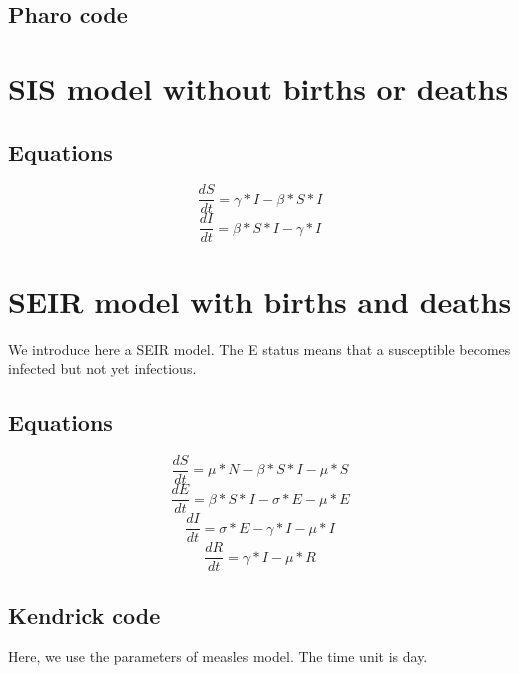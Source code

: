 \documentclass[a4paper,10pt,twoside]{book}
\begin{document}
\subsection{ Pharo code}\section{ SIS model without births or deaths}\subsection{Equations}

\begin{equation}
\frac{dS}{dt} = \gamma*I-\beta*S*I
\end{equation}
\begin{equation}
\frac{dI}{dt} = \beta*S*I-\gamma*I
\end{equation}
\section{ SEIR model with births and deaths}
We introduce here a SEIR model. The E status means that a susceptible becomes infected but not yet infectious.
\subsection{Equations}

  \begin{equation}
    \frac{dS}{dt} = \mu*N - \beta*S*I - \mu*S
  \end{equation}
  \begin{equation}
    \frac{dE}{dt} = \beta*S*I - \sigma*E - \mu*E
  \end{equation}
  \begin{equation}
    \frac{dI}{dt} = \sigma*E - \gamma*I - \mu*I
  \end{equation}
  \begin{equation}
    \frac{dR}{dt} = \gamma*I - \mu*R
  \end{equation}
  
\subsection{Kendrick code}
Here, we use the parameters of measles model. The time unit is day.

\end{document}
